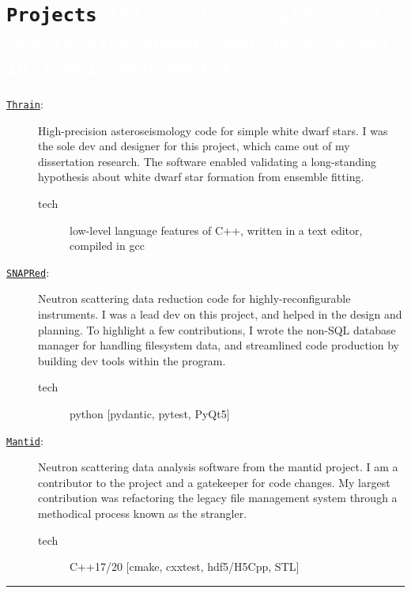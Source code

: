 \documentclass[11pt, letter]{article}
\begin{document}
\section*{\tt Projects {\scriptsize\textcolor{white}{this section would sound really nice summarized as a sonnet in iambic pentameter}}}
\begin{minipage}{\textwidth}
  \begin{description}		
    \item[\href{https://github.com/rboston628/thrain}{\tt Thrain}:]
    High-precision asteroseismology code for simple white dwarf stars.  I was the sole dev and designer for this project, which came out of my dissertation research.  The software enabled validating a long-standing hypothesis about white dwarf star formation from ensemble fitting.
    \begin{description}
      \item[tech] low-level language features of C++, written in a text editor, compiled in gcc
    \end{description}
    \item[\href{https://github.com/neutrons/SNAPRed}{\tt SNAPRed}:]
    Neutron scattering data reduction code for highly-reconfigurable instruments.  I was a lead dev on this project, and helped in the design and planning.  To highlight a few contributions, I wrote the non-SQL database manager for handling filesystem data, and streamlined code production by building dev tools within the program.
    \begin{description}
      \item[tech] python [pydantic, pytest, PyQt5]
    \end{description}
    \item[\href{https://github.com/mantidproject/mantid}{\tt Mantid}:]
    Neutron scattering data analysis software from the mantid project.  I am a contributor to the project and a gatekeeper for code changes.  My largest contribution was refactoring the legacy file management system through a methodical process known as the strangler.
    \begin{description}
      \item[tech] C++17/20 [cmake, cxxtest, hdf5/H5Cpp, STL]
    \end{description}
  \end{description}
\hrule
\end{minipage}
\vspace{-0.5\baselineskip}

\end{document}
